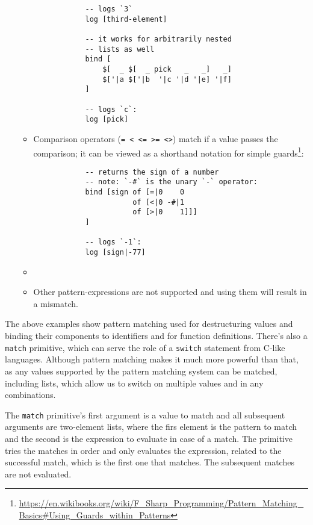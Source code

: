 \begin{itemize}
\begin{itemize}
\begin{lstlisting}
            -- logs `3`
            log [third-element]
            
            -- it works for arbitrarily nested
            -- lists as well
            bind [
                $[  _ $[  _ pick   _   _]   _]
                $['|a $['|b  '|c '|d '|e] '|f]
            ]
            
            -- logs `c`:
            log [pick]
        \end{lstlisting}
        \item Comparison operators (\texttt{= < <= >= <>}) match if a value passes the comparison; it can be viewed as a shorthand notation for simple guards\footnote{\url{https://en.wikibooks.org/wiki/F_Sharp_Programming/Pattern_Matching_Basics\#Using_Guards_within_Patterns}}:
        \begin{lstlisting}
            -- returns the sign of a number
            -- note: `-#` is the unary `-` operator:
            bind [sign of [=|0    0
                       of [<|0 -#|1
                       of [>|0    1]]]
            ]
            
            -- logs `-1`:
            log [sign|-77]
        \end{lstlisting}
        \item %
        \item Other pattern-expressions are not supported and using them will result in a mismatch.
    \end{itemize}
\end{itemize}

The above examples show pattern matching used for destructuring values and binding their components to identifiers and for function definitions. There's also a \texttt{match} primitive, which can serve the role of a \texttt{switch} statement from C-like languages. Although pattern matching makes it much more powerful than that, as any values supported by the pattern matching system can be matched, including lists, which allow us to switch on multiple values and in any combinations.

The \texttt{match} primitive's first argument is a value to match and all subsequent arguments are two-element lists, where the firs element is the pattern to match and the second is the expression to evaluate in case of a match. The primitive tries the matches in order and only evaluates the expression, related to the successful match, which is the first one that matches. The subsequent matches are not evaluated.

